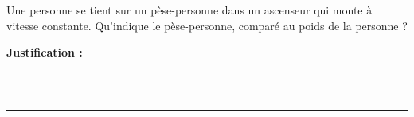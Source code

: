 Une personne se tient sur un pèse-personne dans un ascenseur qui monte à vitesse constante. Qu'indique le pèse-personne, comparé au poids de la personne ?

\choices

\noindent\textbf{Justification :} \hrulefill \\[2.5ex]
\rule{\linewidth}{0.4pt} \\[2.5ex]
\rule{\linewidth}{0.4pt}
\vfill
